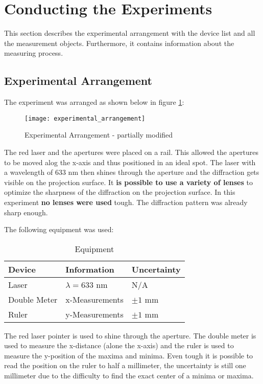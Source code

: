 \section{Conducting the Experiments}
\label{sec:Conducting_the_Experiments}
This section describes the experimental arrangement with the device list and all the measurement objects. Furthermore, it contains information about the measuring process.

\subsection{Experimental Arrangement}
\label{subsec:experimental_arrangement}
The experiment was arranged as shown below in figure \ref{fig:experimental_arrangement}:
\begin{figure}[H]
	\centering
	\texttt{[image: experimental\_arrangement]}
	\caption{Experimental Arrangement \cite{interference} - partially modified}
	\label{fig:experimental_arrangement}
\end{figure}
The red laser and the apertures were placed on a rail. This allowed the apertures to be moved alog the x-axis and thus positioned in an ideal spot. The laser with a wavelength of 633 nm then shines through the aperture and the diffraction gets visible on the projection surface. It \textbf{is possible to use a variety of lenses} to optimize the sharpness of the diffraction on the projection surface. In this experiment \textbf{no lenses were used} tough. The diffraction pattern was already sharp enough.

The following equipment was used:

\begin{table}[H]
	\centering
	\renewcommand{\arraystretch}{1.2}
	\begin{tabular}{l l l}
		\hline
		\textbf{Device} & \textbf{Information} & \textbf{Uncertainty} \\
		\hline
		Laser & $\lambda = 633$ nm & N/A \\
		Double Meter & x-Measurements & $\pm1$ mm \\
		Ruler & y-Measurements & $\pm1$ mm \\ \hline
	\end{tabular}
	\caption{Equipment}
	\label{tab:equipment}
\end{table}

The red laser pointer is used to shine through the aperture. The double meter is used to measure the x-distance (alone the x-axis) and the ruler is used to measure the y-position of the maxima and minima. Even tough it is possible to read the position on the ruler to half a millimeter, the uncertainty is still one millimeter due to the difficulty to find the exact center of a minima or maxima.

